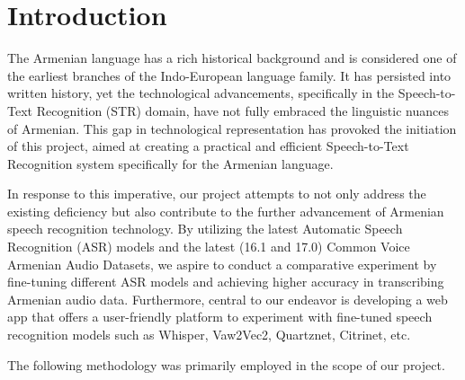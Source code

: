 \documentclass[conference]{IEEEtran}
\begin{document}
\section{Introduction}

The Armenian language has a rich historical background and is considered one of the earliest branches of the Indo-European language family. It has persisted into written history, yet the technological advancements, specifically in the Speech-to-Text Recognition (STR) domain, have not fully embraced the linguistic nuances of Armenian. This gap in technological representation has provoked the initiation of this project, aimed at creating a practical and efficient Speech-to-Text Recognition system specifically for the Armenian language.

In response to this imperative, our project attempts to not only address the existing deficiency but also contribute to the further advancement of Armenian speech recognition technology. By utilizing the latest Automatic Speech Recognition (ASR) models and the latest (16.1 and 17.0) Common Voice Armenian Audio Datasets, we aspire to conduct a comparative experiment by fine-tuning different ASR models and achieving higher accuracy in transcribing Armenian audio data. Furthermore, central to our endeavor is developing a web app that offers a user-friendly platform to experiment with fine-tuned speech recognition models such as Whisper, Vaw2Vec2, Quartznet, Citrinet, etc.

The following methodology was primarily employed in the scope of our project.
\end{document}

